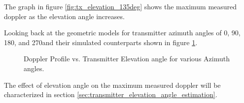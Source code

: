 The graph in figure \ref{fig:tx_elevation_135deg} shows the maximum measured doppler as the elevation angle increases. 

Looking back at the geometric models for transmitter azimuth angles of 0\textdegree \space, 90\textdegree \space, 180\textdegree \space, and 270\textdegree \space and their simulated counterparts shown in figure \ref{fig:verify}.

\begin{figure}
\centering
	\newline
\caption{Doppler Profile vs. Transmitter Elevation angle for various Azimuth angles.}
\label{fig:verify}
\end{figure}

The effect of elevation angle on the maximum measured doppler will be characterized in section \ref{sec:transmitter_elevation_angle_estimation}.



